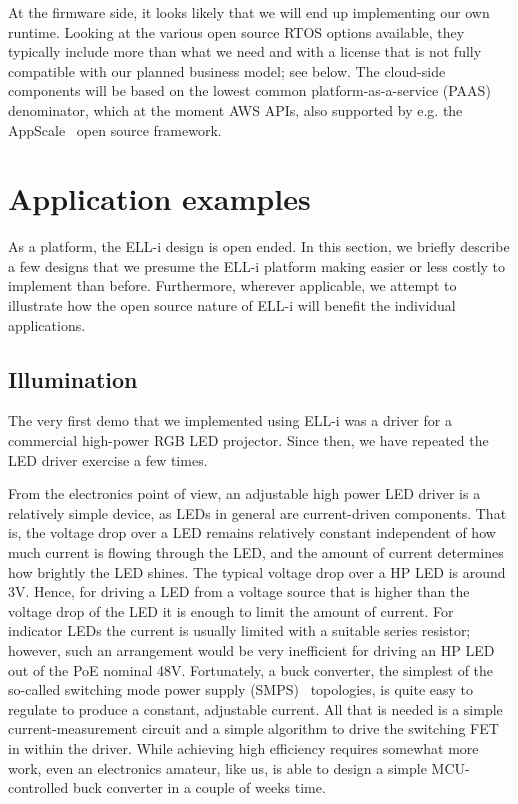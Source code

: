 \documentclass{siamltex}
\begin{document}
At the firmware side, it looks likely that we will end up implementing
our own runtime.  Looking at the various open source RTOS options
available, they typically include more than what we need and with a
license that is not fully compatible with our planned business model;
see below.  The cloud-side components will be based on the lowest
common platform-as-a-service (PAAS) denominator, which at the moment
AWS APIs, also supported by
e.g. the AppScale~\cite{chohan2010appscale} open source framework.


\section{Application examples}
\label{sec:examples}

As a platform, the ELL-i design is open ended.  In this section, we
briefly describe a few designs that we presume the ELL-i platform
making easier or less costly to implement than before.  Furthermore,
wherever applicable, we attempt to illustrate how the open source
nature of ELL-i will benefit the individual applications.

\subsection{Illumination}

The very first demo that we implemented using ELL-i was a driver for a
commercial high-power RGB LED
projector.  Since then, we have repeated the LED driver exercise a few
times.

From the electronics point of view, an adjustable high power LED driver is a
relatively simple device, as LEDs in general are current-driven
components.  That is, the voltage drop over a LED remains relatively
constant independent of how much current is flowing through the LED,
and the amount of current determines how brightly the LED shines.  The
typical voltage drop over a HP LED is around 3V.  Hence, for driving a
LED from a voltage source that is higher than the voltage drop of the
LED it is enough to limit the amount of current.  For indicator LEDs
the current is usually limited with a suitable series resistor;
however, such an arrangement would be very inefficient for driving an
HP LED out of the PoE nominal 48V.  Fortunately, a buck
converter, the simplest of the so-called
switching mode power supply (SMPS)~\cite{maniktala2012switching} topologies, 
is quite
easy to regulate to produce a constant, adjustable current.  All that
is needed is a simple current-measurement circuit and a simple
algorithm to drive the switching FET in within the driver.  While
achieving high efficiency requires somewhat more work, even an
electronics amateur, like us, is able to design a simple
MCU-controlled buck converter in a couple of weeks time.
\end{document}

